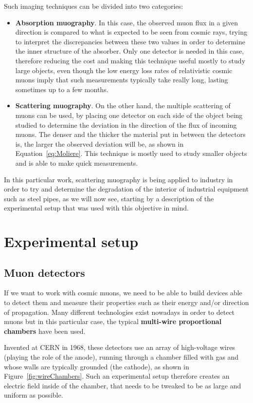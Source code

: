 \documentclass[a4paper, 11pt]{report}
\begin{document}
Such imaging techniques can be divided into two categories:
\begin{itemize}
\item \textbf{Absorption muography}. In this case, the observed muon flux in a given direction is compared to what is expected to be seen from cosmic rays, trying to interpret the discrepancies between these two values in order to determine the inner structure of the absorber. Only one detector is needed in this case, therefore reducing the cost and making this technique useful mostly to study large objects, even though the low energy loss rates of relativistic cosmic muons imply that such measurements typically take really long, lasting sometimes up to a few months.
\item \textbf{Scattering muography}. On the other hand, the multiple scattering of muons can be used, by placing one detector on each side of the object being studied to determine the deviation in the direction of the flux of incoming muons. The denser and the thicker the material put in between the detectors is, the larger the observed deviation will be, as shown in Equation~\ref{eq:Moliere}. This technique is mostly used to study smaller objects and is able to make quick measurements.
\end{itemize}

In this particular work, scattering muography is being applied to industry in order to try and determine the degradation of the interior of industrial equipment such as steel pipes, as we will now see, starting by a description of the experimental setup that was used with this objective in mind.

\section{Experimental setup} \label{sec:setup}

\subsection{Muon detectors} \label{sec:muonDetectors}

If we want to work with cosmic muons, we need to be able to build devices able to detect them and measure their properties such as their energy and/or direction of propagation. Many different technologies exist nowadays in order to detect muons but in this particular case, the typical \textbf{multi-wire proportional chambers} have been used.

Invented at CERN in 1968, these detectors use an array of high-voltage wires (playing the role of the anode), running through a chamber filled with gas and whose walls are typically grounded (the cathode), as shown in Figure~\ref{fig:wireChambers}. Such an experimental setup therefore creates an electric field inside of the chamber, that needs to be tweaked to be as large and uniform as possible.
\end{document}

